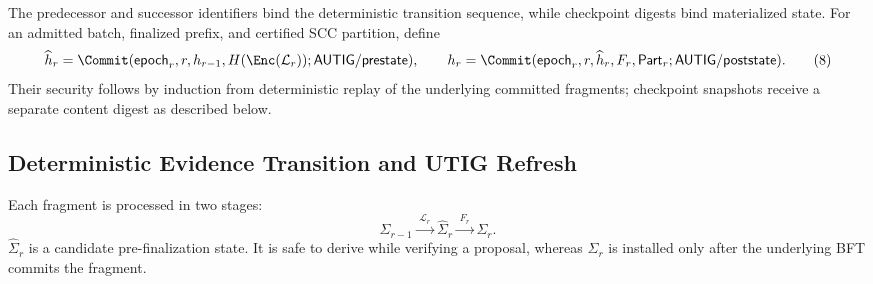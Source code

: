 The predecessor and successor identifiers bind the deterministic transition
sequence, while checkpoint digests bind materialized state.  For an admitted
batch, finalized prefix, and certified SCC partition, define
\[
 \widehat h_r=\Commit(\mathsf{epoch}_r,r,h_{r-1},
                    H(\Enc(\mathcal L_r));
                    \mathsf{AUTIG/prestate}),
 \qquad
 h_r=\Commit(\mathsf{epoch}_r,r,\widehat h_r,F_r,\mathsf{Part}_r;
             \mathsf{AUTIG/poststate}).
 \tag{8}\label{eq:state-identifiers}
\]
Their security follows by induction from deterministic replay of the
underlying committed fragments; checkpoint snapshots receive a separate
content digest as described below.

\subsection{Deterministic Evidence Transition and UTIG Refresh}
\label{sec:evidence-transition}

Each fragment is processed in two stages:
\[
 \Sigma_{r-1}\xrightarrow{\;\mathcal L_r\;}
 \widehat\Sigma_r\xrightarrow{\;F_r\;}
 \Sigma_r.
 \tag{9}\label{eq:two-stage-transition}
\]
$\widehat\Sigma_r$ is a candidate pre-finalization state.  It is safe to
derive while verifying a proposal, whereas $\Sigma_r$ is installed only after
the underlying BFT commits the fragment.

